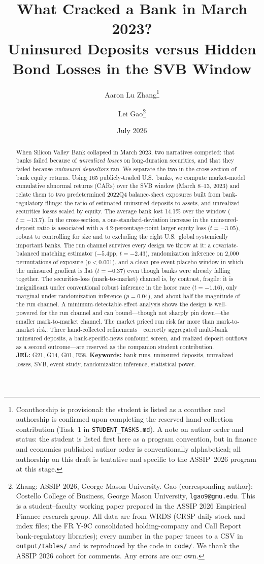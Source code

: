 \documentclass[12pt]{article}
\title{\textbf{What Cracked a Bank in March 2023?\\
Uninsured Deposits versus Hidden Bond Losses in the SVB Window}}
\author{Aaron Lu Zhang\thanks{Coauthorship is provisional: the student is listed as a coauthor and authorship is confirmed upon completing the reserved hand-collection contribution (Task~1 in \texttt{STUDENT\_TASKS.md}). A note on author order and status: the student is listed first here as a program convention, but in finance and economics published author order is conventionally alphabetical; all authorship on this draft is tentative and specific to the ASSIP~2026 program at this stage.} \and Lei Gao\thanks{Zhang: ASSIP 2026, George Mason University.
Gao (corresponding author): Costello College of Business, George Mason University,
\texttt{lgao9@gmu.edu}. This is a student--faculty working paper prepared in the ASSIP 2026
Empirical Finance research group. All data are from WRDS (CRSP daily stock and index files;
the FR Y-9C consolidated holding-company and Call Report bank-regulatory libraries); every
number in the paper traces to a CSV in \texttt{output/tables/} and is reproduced by the code
in \texttt{code/}. We thank the ASSIP 2026 cohort for comments. Any errors are our own.}}
\date{July 2026}
\begin{document}
\maketitle

\begin{abstract}
\noindent When Silicon Valley Bank collapsed in March 2023, two narratives competed:
that banks failed because of \emph{unrealized losses} on long-duration securities, and
that they failed because \emph{uninsured depositors} ran. We separate the two in the
cross-section of bank equity returns. Using 165 publicly-traded U.S.\ banks, we compute
market-model cumulative abnormal returns (CARs) over the SVB window (March 8--13, 2023)
and relate them to two predetermined 2022Q4 balance-sheet exposures built from
bank-regulatory filings: the ratio of estimated uninsured deposits to assets, and unrealized
securities losses scaled by equity. The average bank lost 14.1\% over the window
($t=-13.7$). In the cross-section, a one-standard-deviation increase in the uninsured-deposit
ratio is associated with a 4.2-percentage-point larger equity loss ($t=-3.05$), robust to
controlling for size and to excluding the eight U.S.\ global systemically important banks.
The run channel survives every design we throw at it: a covariate-balanced matching estimator
($-5.4$pp, $t=-2.43$), randomization inference on 2{,}000 permutations of exposure
($p<0.001$), and a clean pre-event placebo window in which the uninsured gradient is flat
($t=-0.37$) even though banks were already falling together. The securities-loss (mark-to-market)
channel is, by contrast, fragile: it is insignificant under conventional robust inference in the
horse race ($t=-1.16$), only marginal under randomization inference ($p=0.04$), and about half
the magnitude of the run channel. A minimum-detectable-effect analysis shows the design is
well-powered for the run channel and can bound---though not sharply pin down---the smaller
mark-to-market channel. The market priced run risk far more than mark-to-market risk. Three
hand-collected refinements---correctly aggregated multi-bank uninsured deposits, a
bank-specific-news confound screen, and realized deposit outflows as a second outcome---are
reserved as the companion student contribution.\\[4pt]
\noindent\textbf{JEL:} G21, G14, G01, E58. \quad
\textbf{Keywords:} bank runs, uninsured deposits, unrealized losses, SVB, event study,
randomization inference, statistical power.
\end{abstract}
\end{document}

